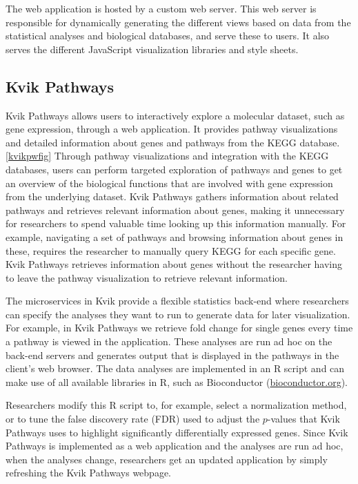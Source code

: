 The web application is hosted by a custom web server. This web server is
responsible for dynamically generating the different views based on data from
the statistical analyses and biological databases, and serve these to users. It
also serves the different JavaScript visualization libraries and style sheets. 

\subsection{Kvik Pathways}
Kvik Pathways allows users to interactively explore a molecular dataset,
such as gene expression, through a web application. It provides pathway
visualizations and detailed information about genes and pathways from the
KEGG database. \ref{kvikpwfig} Through pathway visualizations and integration
with the KEGG databases, users can perform targeted exploration of
pathways and genes to get an overview of the biological functions that are
involved with gene expression from the underlying dataset. Kvik Pathways gathers
information about related pathways and retrieves relevant information about
genes, making it unnecessary for researchers to spend valuable time looking up
this information manually. For example, navigating a set of pathways and
browsing information about genes in these, requires the researcher to manually
query KEGG for each specific gene.  Kvik Pathways retrieves information about
genes without the researcher having to leave the pathway visualization to
retrieve relevant information. 

The microservices in Kvik provide a flexible statistics back-end where
researchers can specify the analyses they want to run to generate data for later
visualization. For example, in Kvik Pathways we retrieve fold change for single
genes every time a pathway is viewed in the application.  These analyses are run
ad hoc on the back-end servers and generates output that is displayed in the
pathways in the client's web browser. The data analyses are implemented in an R
script and can make use of all available libraries in R, such as Bioconductor
(\href{bioconductor.org}{bioconductor.org}). 

Researchers modify this R script to, for example, select a normalization method,
or to tune the false discovery rate (FDR) used to adjust the $p$-values that
Kvik Pathways uses to highlight significantly differentially expressed genes.
Since Kvik Pathways is implemented as a web application and the analyses are run
ad hoc, when the analyses change, researchers get an updated application by
simply refreshing the Kvik Pathways webpage. 




